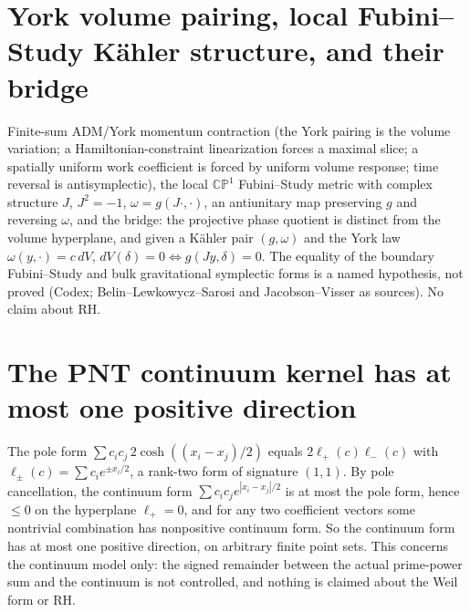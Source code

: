 \documentclass{report}
\theoremstyle{definition}
\begin{document}
\begin{itemize}
\begin{itemize}
\section{York volume pairing, local Fubini--Study K\"ahler structure, and their bridge}
Finite-sum ADM/York momentum contraction (the York pairing is the volume variation; a
Hamiltonian-constraint linearization forces a maximal slice; a spatially uniform work coefficient
is forced by uniform volume response; time reversal is antisymplectic), the local $\mathbb{CP}^1$
Fubini--Study metric with complex structure $J$, $J^2=-1$, $\omega=g(J\cdot,\cdot)$, an antiunitary
map preserving $g$ and reversing $\omega$, and the bridge: the projective phase quotient is distinct
from the volume hyperplane, and given a K\"ahler pair $(g,\omega)$ and the York law
$\omega(y,\cdot)=c\,dV$, $dV(\delta)=0\iff g(Jy,\delta)=0$. The equality of the boundary
Fubini--Study and bulk gravitational symplectic forms is a named hypothesis, not proved
(Codex; Belin--Lewkowycz--Sarosi and Jacobson--Visser as sources). No claim about RH.

\section{The PNT continuum kernel has at most one positive direction}
The pole form $\sum c_ic_j\,2\cosh((x_i-x_j)/2)$ equals $2\ell_+(c)\ell_-(c)$ with
$\ell_\pm(c)=\sum c_ie^{\pm x_i/2}$, a rank-two form of signature $(1,1)$. By pole cancellation, the
continuum form $\sum c_ic_j e^{|x_i-x_j|/2}$ is at most the pole form, hence $\le0$ on the hyperplane
$\ell_+=0$, and for any two coefficient vectors some nontrivial combination has nonpositive continuum
form. So the continuum form has at most one positive direction, on arbitrary finite point sets. This
concerns the continuum model only: the signed remainder between the actual prime-power sum and the
continuum is not controlled, and nothing is claimed about the Weil form or RH.


\end{itemize}
\end{itemize}
\end{document}
